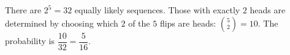 There are $2^5=32$ equally likely sequences. Those with exactly $2$ heads are determined by choosing which $2$ of the $5$ flips are heads: $\binom52=10$. The probability is $\dfrac{10}{32}=\boxed{\dfrac{5}{16}}$.

